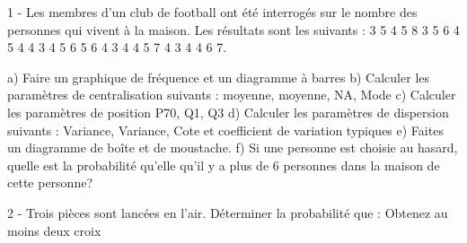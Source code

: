 1 - Les membres d'un club de football ont été interrogés sur le nombre des personnes qui vivent à la maison. Les résultats sont les suivants : 3 5 4 5 8 3 5 6 4 5 4 4 3 4 5 6 5 6 4 3 4 4 5 7 4 3 4 4 6 7.


a) Faire un graphique de fréquence et un diagramme à barres  b) Calculer les paramètres de centralisation suivants : moyenne, moyenne, NA, Mode 
c) Calculer les paramètres de position P70, Q1, Q3 
d) Calculer les paramètres de dispersion suivants : Variance, Variance, Cote et coefficient de variation typiques 
e) Faites un diagramme de boîte et de moustache. 
f) Si une personne est choisie au hasard, quelle est la probabilité qu'elle qu'il y a plus de 6 personnes dans la maison de cette personne?


2 - Trois pièces sont lancées en l'air. Déterminer la probabilité que : Obtenez au moins deux croix